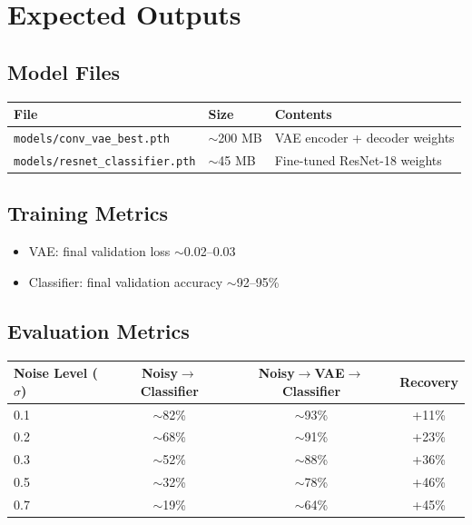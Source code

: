 \documentclass[11pt,a4paper]{article}
\begin{document}
\newpage


\section{Expected Outputs}

\subsection{Model Files}
\begin{center}
\begin{tabular}{@{}lll@{}}
\toprule
\textbf{File} & \textbf{Size} & \textbf{Contents} \\
\midrule
\texttt{models/conv\_vae\_best.pth} & $\sim$200 MB & VAE encoder + decoder weights \\
\texttt{models/resnet\_classifier.pth} & $\sim$45 MB & Fine-tuned ResNet-18 weights \\
\bottomrule
\end{tabular}
\end{center}

\subsection{Training Metrics}
\begin{itemize}[noitemsep]
    \item VAE: final validation loss $\sim$0.02--0.03
    \item Classifier: final validation accuracy $\sim$92--95\%
\end{itemize}

\subsection{Evaluation Metrics}
\begin{center}
\begin{tabular}{@{}lccc@{}}
\toprule
\textbf{Noise Level ($\sigma$)} & \textbf{Noisy$\rightarrow$Classifier} & \textbf{Noisy$\rightarrow$VAE$\rightarrow$Classifier} & \textbf{Recovery} \\
\midrule
0.1 & $\sim$82\% & $\sim$93\% & +11\% \\
0.2 & $\sim$68\% & $\sim$91\% & +23\% \\
0.3 & $\sim$52\% & $\sim$88\% & +36\% \\
0.5 & $\sim$32\% & $\sim$78\% & +46\% \\
0.7 & $\sim$19\% & $\sim$64\% & +45\% \\
\bottomrule
\end{tabular}
\end{center}
\end{document}
